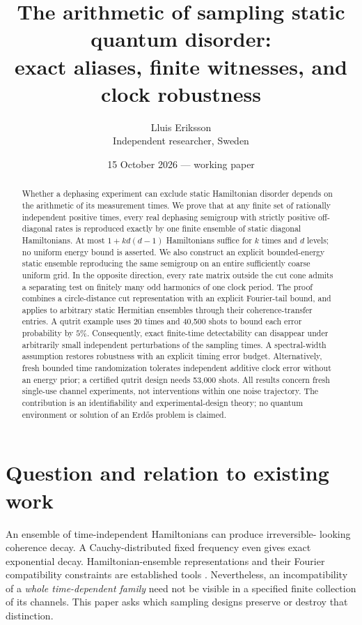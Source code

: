 \documentclass[11pt,a4paper]{article}
\title{The arithmetic of sampling static quantum disorder:\\exact aliases, finite witnesses, and clock robustness}
\author{Lluis Eriksson\\\small Independent researcher, Sweden}
\date{15 October 2026 --- working paper}
\theoremstyle{remark}\newtheorem{remark}[theorem]{Remark}
\begin{document}
\maketitle
\begin{abstract}
Whether a dephasing experiment can exclude static Hamiltonian disorder
depends on the arithmetic of its measurement times. We prove that at any
finite set of rationally independent positive times, every real dephasing
semigroup with strictly positive off-diagonal rates is reproduced exactly
by one finite ensemble of static diagonal Hamiltonians. At most
$1+k d(d-1)$ Hamiltonians suffice for $k$ times and $d$ levels; no uniform
energy bound is asserted. We also construct an explicit bounded-energy
static ensemble reproducing the same semigroup on an entire sufficiently
coarse uniform grid. In the opposite direction, every rate matrix outside
the cut cone admits a separating test on finitely many odd harmonics of
one clock period. The proof combines a circle-distance cut representation
with an explicit Fourier-tail bound, and applies to arbitrary static
Hermitian ensembles through their coherence-transfer entries. A qutrit
example uses 20 times and 40,500 shots to bound each error probability by
$5\%$. Consequently, exact finite-time detectability can disappear under
arbitrarily small independent perturbations of the sampling times. A
spectral-width assumption restores robustness with an explicit timing
error budget. Alternatively, fresh bounded time randomization tolerates
independent additive clock error without an energy prior; a certified
qutrit design needs 53,000 shots. All results concern fresh single-use channel experiments,
not interventions within one noise trajectory. The contribution is an
identifiability and experimental-design theory; no quantum environment or
solution of an Erd\H{o}s problem is claimed.
\end{abstract}

\section{Question and relation to existing work}
An ensemble of time-independent Hamiltonians can produce irreversible-
looking coherence decay. A Cauchy-distributed fixed frequency even gives
exact exponential decay. Hamiltonian-ensemble representations and their
Fourier compatibility constraints are established tools
\cite{chen2018,chen2019,chen2021,kropf}. Nevertheless, an incompatibility
of a \emph{whole time-dependent family} need not be visible in a specified
finite collection of its channels. This paper asks which sampling designs
preserve or destroy that distinction.
\end{document}

